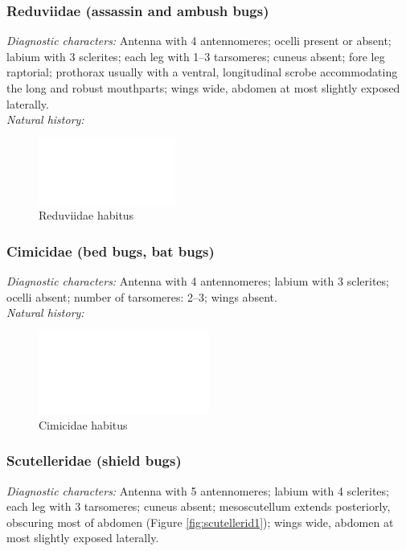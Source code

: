 \documentclass[letterpaper, 11pt]{article}
\begin{document}
\subsubsection{Reduviidae (assassin and ambush bugs)}
\noindent{}\textit{Diagnostic characters:} Antenna with 4 antennomeres; ocelli present or absent; labium with 3 sclerites; each leg with 1--3 tarsomeres; cuneus absent; fore leg raptorial; prothorax usually with a ventral, longitudinal scrobe accommodating the long and robust mouthparts; wings wide, abdomen at most slightly exposed laterally.\\

\noindent{}\textit{Natural history:} \\

\begin{figure}[ht!]
 \centering
 \includegraphics[width=0.4\textwidth]{image14}
 \caption{Reduviidae habitus}
 \label{fig:reduviid1}
\end{figure}

\subsubsection{Cimicidae (bed bugs, bat bugs)}
\noindent{}\textit{Diagnostic characters:} Antenna with 4 antennomeres; labium with 3 sclerites; ocelli absent; number of tarsomeres: 2--3; wings absent.\\

\noindent{}\textit{Natural history:} \\

\begin{figure}[ht!]
 \centering
 \includegraphics[width=0.5\textwidth]{image14}
 \caption{Cimicidae habitus}
 \label{fig:cimicid1}
\end{figure}

\subsubsection{Scutelleridae (shield bugs)}
\noindent{}\textit{Diagnostic characters:} Antenna with 5 antennomeres; labium with 4 sclerites; each leg with 3 tarsomeres; cuneus absent; mesoscutellum extends posteriorly, obscuring most of abdomen (Figure \ref{fig:scutellerid1}); wings wide, abdomen at most slightly exposed laterally.\\
\end{document}
